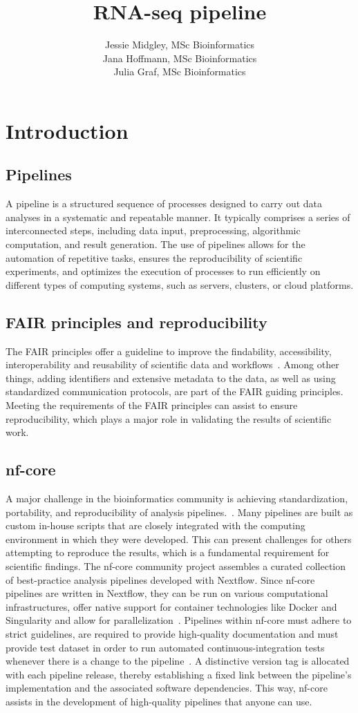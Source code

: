 \documentclass[12pt]{article}
\title{\textbf{RNA-seq pipeline}}
\author{Jessie Midgley, MSc Bioinformatics
\\ Jana Hoffmann, MSc Bioinformatics
\\ Julia Graf, MSc Bioinformatics}
\begin{document}
\maketitle



\section{Introduction}
\subsection{Pipelines}
A pipeline is a structured sequence of processes designed to carry out data analyses in a systematic and repeatable manner. It typically comprises a series of interconnected steps, including data input, preprocessing, algorithmic computation, and result generation. The use of pipelines allows for the automation of repetitive tasks, ensures the reproducibility of scientific experiments, and optimizes the execution of processes to run efficiently on different types of computing systems, such as servers, clusters, or cloud platforms.
\subsection{FAIR principles and reproducibility}
The FAIR principles offer a guideline to improve the findability, accessibility, interoperability and reusability of scientific data and workflows~\cite{wilkinson2016fair}.
Among other things, adding identifiers and extensive metadata to the data, as well as using standardized communication protocols, are part of the FAIR guiding principles. Meeting the requirements of the FAIR principles can assist to ensure reproducibility, which plays a major role in validating the results of scientific work.
\subsection{nf-core}
A major challenge in the bioinformatics community is achieving standardization, portability, and reproducibility of analysis pipelines.~\cite{ewels2020nf}. Many pipelines are built as custom in-house scripts that are closely integrated with the computing environment in which they were developed. This can present challenges for others attempting to reproduce the results, which is a fundamental requirement for scientific findings. The nf-core community project assembles a curated collection of best-practice analysis pipelines developed with Nextflow. Since nf-core pipelines are written in Nextflow, they can be run on various computational infrastructures, offer native support for container technologies like Docker and Singularity and allow for parallelization~\cite{di2017nextflow}. Pipelines within nf-core must adhere to strict guidelines, are required to provide high-quality documentation and must provide test dataset in order to run automated continuous-integration tests whenever there is a change to the pipeline~\cite{ewels2020nf}. A distinctive version tag is allocated with each pipeline release, thereby establishing a fixed link between the pipeline's implementation and the associated software dependencies. This way, nf-core assists in the development of high-quality pipelines that anyone can use.
\end{document}
